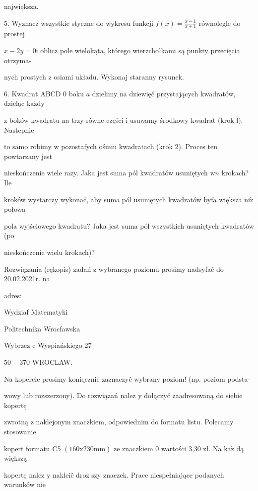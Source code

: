 \documentclass[a4paper,12pt]{article}
\begin{document}
największa.

5. Wyznacz wszystkie styczne do wykresu funkcji $f(x)=\displaystyle \frac{x-1}{x+1}$ równolegle do prostej

$x-2y=0\mathrm{i}$ oblicz pole wielokąta, którego wierzchołkami są punkty przecięcia otrzyma-

nych prostych $\mathrm{z}$ osiami układu. Wykonaj staranny rysunek.

6. Kwadrat ABCD $0$ boku $a$ dzielimy na dziewięč przystających kwadratów, dzieląc $\mathrm{k}\mathrm{a}\dot{\mathrm{z}}\mathrm{d}\mathrm{y}$

$\mathrm{z}$ boków kwadratu na trzy równe części $\mathrm{i}$ usuwamy środkowy kwadrat (krok l). Nastepnie

to samo robimy $\mathrm{w}$ pozostafych ośmiu kwadratach (krok 2). Proces ten powtarzany jest

nieskończenie wiele razy. Jaka jest suma pól kwadratów usuniętych $\mathrm{w}n$ krokach? Ile

kroków wystarczy wykonač, aby suma pól usuniętych kwadratów byfa większa $\mathrm{n}\mathrm{i}\dot{\mathrm{z}}$ połowa

pola wyjściowego kwadratu? Jaka jest suma pól wszystkich usuniętych kwadratów (po

nieskończenie wielu krokach)?

Rozwiązania (rękopis) zadań z wybranego poziomu prosimy nadsyfač do 20.02.2021r. na

adres:

Wydziaf Matematyki

Politechnika Wrocfawska

Wybrzez $\mathrm{e}$ Wyspiańskiego 27

$50-370$ WROCLAW.

Na kopercie prosimy $\underline{\mathrm{k}\mathrm{o}\mathrm{n}\mathrm{i}\mathrm{e}\mathrm{c}\mathrm{z}\mathrm{n}\mathrm{i}\mathrm{e}}$ zaznaczyč wybrany poziom! (np. poziom podsta-

wowy lub rozszerzony). Do rozwiązań nalez $\mathrm{y}$ dołączyč zaadresowaną do siebie kopertę

zwrotną $\mathrm{z}$ naklejonym znaczkiem, odpowiednim do formatu listu. Polecamy stosowanie

kopert formatu C5 $(160\mathrm{x}230\mathrm{m}\mathrm{m})$ ze znaczkiem $0$ wartości 3,30 zł. Na $\mathrm{k}\mathrm{a}\dot{\mathrm{z}}$ dą większą

kopertę nalez $\mathrm{y}$ nakleič $\mathrm{d}\mathrm{r}\mathrm{o}\dot{\mathrm{z}}$ szy znaczek. Prace niespełniające podanych warunków nie
\end{document}
